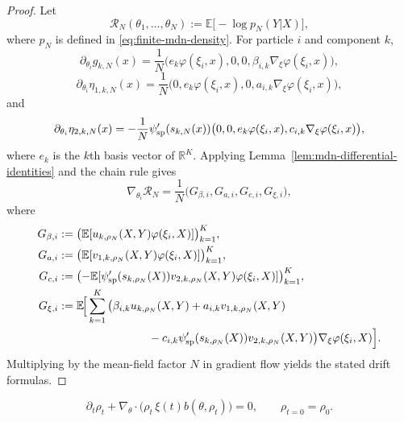 \documentclass[11pt]{article}
\theoremstyle{definition}
\newcommand{\R}{\mathbb{R}}
\newcommand{\E}{\mathbb{E}}
\newcommand{\mc}[1]{\mathcal{#1}}
\begin{document}
\begin{proof}
Let
\[
  \mc{R}_N(\theta_1,\dots,\theta_N)
  :=
  \E\big[-\log p_N(Y|X)\big],
\]
where $p_N$ is defined in \eqref{eq:finite-mdn-density}. For particle $i$ and
component $k$,
\[
  \partial_{\theta_i} g_{k,N}(x)
  =
  \frac1N\bigl(e_k\varphi(\xi_i,x),0,0,\beta_{i,k}\nabla_\xi\varphi(\xi_i,x)\bigr),
\]
\[
  \partial_{\theta_i}\eta_{1,k,N}(x)
  =
  \frac1N\bigl(0,e_k\varphi(\xi_i,x),0,a_{i,k}\nabla_\xi\varphi(\xi_i,x)\bigr),
\]
and
\[
  \partial_{\theta_i}\eta_{2,k,N}(x)
  =
  -\frac1N\psi_{\rm sp}'(s_{k,N}(x))
  \bigl(0,0,e_k\varphi(\xi_i,x),c_{i,k}\nabla_\xi\varphi(\xi_i,x)\bigr),
\]
where $e_k$ is the $k$th basis vector of $\R^K$. Applying
Lemma~\ref{lem:mdn-differential-identities} and the chain rule gives
\[
  \nabla_{\theta_i}\mc{R}_N
  =
  \frac1N\bigl(G_{\beta,i},G_{a,i},G_{c,i},G_{\xi,i}\bigr),
\]
where
\begin{align*}
  G_{\beta,i}
  &:=
  \bigl(\E[u_{k,\rho_N}(X,Y)\varphi(\xi_i,X)]\bigr)_{k=1}^K,
  \\
  G_{a,i}
  &:=
  \bigl(\E[v_{1,k,\rho_N}(X,Y)\varphi(\xi_i,X)]\bigr)_{k=1}^K,
  \\
  G_{c,i}
  &:=
  \bigl(
    -\E[\psi_{\rm sp}'(s_{k,\rho_N}(X))v_{2,k,\rho_N}(X,Y)\varphi(\xi_i,X)]
  \bigr)_{k=1}^K,
  \\
  G_{\xi,i}
  &:=
  \E\!\Big[
    \sum_{k=1}^K
    \big(
      \beta_{i,k}u_{k,\rho_N}(X,Y)
      +a_{i,k}v_{1,k,\rho_N}(X,Y)
    \\
    &\hspace{8em}
      -c_{i,k}\psi_{\rm sp}'(s_{k,\rho_N}(X))v_{2,k,\rho_N}(X,Y)
    \big)\nabla_\xi\varphi(\xi_i,X)
  \Big].
\end{align*}
Multiplying by the mean-field factor $N$ in gradient flow yields the stated
drift formulas.
\end{proof}

\begin{equation}
  \partial_t \rho_t
  +
  \nabla_\theta\cdot\bigl(\rho_t\,\xi(t)b(\theta,\rho_t)\bigr)
  =
  0,
  \qquad
  \rho_{t=0}=\rho_0.
  \label{eq:mdn-sgd-pde}
\end{equation}
\end{document}
